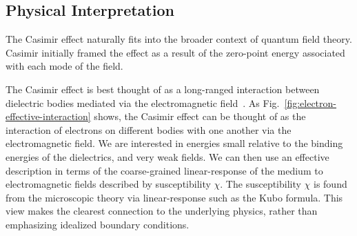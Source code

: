 \subsection{Physical Interpretation}

The Casimir effect naturally fits into the broader context of quantum field theory.  
Casimir initially framed the effect as a result of the zero-point energy associated with each mode of
the field.  

The Casimir effect is best thought of as a long-ranged interaction between dielectric bodies 
mediated via the electromagnetic field~\cite{Jaffe2005, Rahi2009}.
As Fig.~\ref{fig:electron-effective-interaction} shows, the Casimir effect can be thought of as the 
interaction of electrons on different bodies with one another via the electromagnetic field.  
We are interested in energies small relative to the binding energies of the dielectrics, and very weak
fields.  We can then use an effective description in terms of the coarse-grained linear-response of the 
medium to electromagnetic fields described by susceptibility $\chi$.  The susceptibility $\chi$
is found from the microscopic theory via linear-response such as the Kubo formula.
This view makes the clearest connection to the underlying physics, rather than emphasizing idealized
boundary conditions.  



